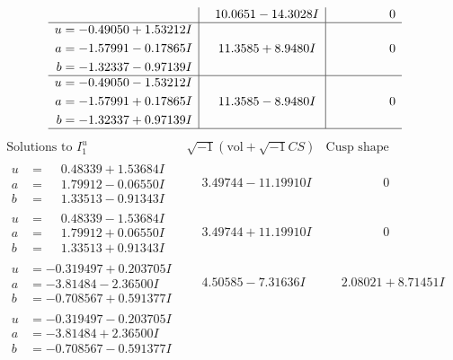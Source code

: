 \documentclass[1p]{elsarticle_modified}
\theoremstyle{definition}
\newcommand{\I}{\sqrt{-1}}
\begin{document}
$$\begin{array}{c|c|c}
 & \phantom{-}10.0651 - 14.3028 I & \phantom{-0.000000 } 0 \\ \hline\begin{aligned}
u &= -0.49050 + 1.53212 I \\
a &= -1.57991 - 0.17865 I \\
b &= -1.32337 - 0.97139 I\end{aligned}
 & \phantom{-}11.3585 + 8.9480 I & \phantom{-0.000000 } 0 \\ \hline\begin{aligned}
u &= -0.49050 - 1.53212 I \\
a &= -1.57991 + 0.17865 I \\
b &= -1.32337 + 0.97139 I\end{aligned}
 & \phantom{-}11.3585 - 8.9480 I & \phantom{-0.000000 } 0\\
 \hline 
 \end{array}$$\newpage$$\begin{array}{c|c|c}  
\text{Solutions to }I^u_{1}& \I (\text{vol} + \sqrt{-1}CS) & \text{Cusp shape}\\
 \hline 
\begin{aligned}
u &= \phantom{-}0.48339 + 1.53684 I \\
a &= \phantom{-}1.79912 - 0.06550 I \\
b &= \phantom{-}1.33513 - 0.91343 I\end{aligned}
 & \phantom{-}3.49744 - 11.19910 I & \phantom{-0.000000 } 0 \\ \hline\begin{aligned}
u &= \phantom{-}0.48339 - 1.53684 I \\
a &= \phantom{-}1.79912 + 0.06550 I \\
b &= \phantom{-}1.33513 + 0.91343 I\end{aligned}
 & \phantom{-}3.49744 + 11.19910 I & \phantom{-0.000000 } 0 \\ \hline\begin{aligned}
u &= -0.319497 + 0.203705 I \\
a &= -3.81484 - 2.36500 I \\
b &= -0.708567 + 0.591377 I\end{aligned}
 & \phantom{-}4.50585 - 7.31636 I & \phantom{-}2.08021 + 8.71451 I \\ \hline\begin{aligned}
u &= -0.319497 - 0.203705 I \\
a &= -3.81484 + 2.36500 I \\
b &= -0.708567 - 0.591377 I\end{aligned}

\end{array}$$
\end{document}
